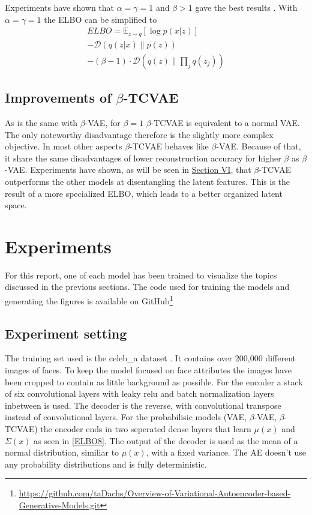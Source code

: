 \documentclass[a4paper]{IEEEtran}
\begin{document}
{Experiments have shown that $\alpha = \gamma = 1$ and $\beta > 1$ gave the best results \cite{chen2019isolating}. With $\alpha = \gamma = 1$ the ELBO can be simplified to
\begin{align*}
	ELBO = \mathbb{E}_{z \sim q}\left[ \log p(x|z) \right]\\
	 - \mathcal{D}(q(z|x) \| p(z))\\
	 - (\beta - 1) \cdot \mathcal{D}(q(z) \| \prod_j q(z_j))
\end{align*}

\subsection{Improvements of $\beta$-TCVAE}
As is the same with $\beta$-VAE, for $\beta = 1$ $\beta$-TCVAE is equivalent to a normal VAE. The only noteworthy disadvantage therefore is the slightly more complex objective. In most other aspects $\beta$-TCVAE behaves like $\beta$-VAE. Because of that, it share the same disadvantages of lower reconstruction accuracy for higher $\beta$ as $\beta$-VAE. Experiments have shown, as will be seen in \hyperref[sec:experiments]{Section VI}, that $\beta$-TCVAE outperforms the other models at disentangling the latent features. This is the result of a more specialized ELBO, which leads to a better organized latent space. 

\section{Experiments}
\label{sec:experiments}


For this report, one of each model has been trained to visualize the topics discussed in the previous sections. The code used for training the models and generating the figures is available on GitHub\footnote{\url{https://github.com/taDachs/Overview-of-Variational-Autoencoder-based-Generative-Models.git}}

\subsection{Experiment setting}
The training set used is the celeb\_a dataset \cite{liu2015faceattributes}. It contains over 200,000 different images of faces. To keep the model focused on face attributes the images have been cropped to contain as little background as possible. For the encoder a stack of six convolutional layers with leaky relu and batch normalization layers inbetween is used. The decoder is the reverse, with convolutional transpose instead of convolutional layers. For the probabilisic models (VAE, $\beta$-VAE, $\beta$-TCVAE) the encoder ends in two seperated dense layers that learn $\mu(x)$ and $\Sigma(x)$ as seen in \eqref{ELBO8}. The output of the decoder is used as the mean of a normal distribution, similiar to $\mu(x)$, with a fixed variance. The AE doesn't use any probability distributions and is fully deterministic.

}
\end{document}
